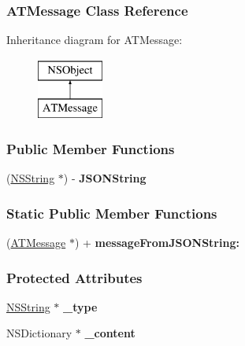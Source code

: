 \hypertarget{interface_a_t_message}{
\subsubsection{ATMessage Class Reference}
\label{interface_a_t_message}
}
Inheritance diagram for ATMessage:\begin{figure}[h]
\begin{center}
\leavevmode
\includegraphics[height=2.000000cm]{interface_a_t_message}
\end{center}
\end{figure}
\subsubsection*{Public Member Functions}
\begin{DoxyCompactItemize}
\item 
\hypertarget{interface_a_t_message_a479b92f064ea3982fe3fa1dc0046da64}{
(\hyperlink{class_n_s_string}{NSString} $\ast$) -\/ {\bfseries JSONString}}
\label{interface_a_t_message_a479b92f064ea3982fe3fa1dc0046da64}

\end{DoxyCompactItemize}
\subsubsection*{Static Public Member Functions}
\begin{DoxyCompactItemize}
\item 
\hypertarget{interface_a_t_message_a899be809d07eddd49c7a69edcdbbc643}{
(\hyperlink{interface_a_t_message}{ATMessage} $\ast$) + {\bfseries messageFromJSONString:}}
\label{interface_a_t_message_a899be809d07eddd49c7a69edcdbbc643}

\end{DoxyCompactItemize}
\subsubsection*{Protected Attributes}
\begin{DoxyCompactItemize}
\item 
\hypertarget{interface_a_t_message_a55260e89bdf6b62ed070c9c3109e1717}{
\hyperlink{class_n_s_string}{NSString} $\ast$ {\bfseries \_\-type}}
\label{interface_a_t_message_a55260e89bdf6b62ed070c9c3109e1717}

\item 
\hypertarget{interface_a_t_message_adfc3efefff0092008dfc5a77ab28f093}{
NSDictionary $\ast$ {\bfseries \_\-content}}
\label{interface_a_t_message_adfc3efefff0092008dfc5a77ab28f093}

\end{DoxyCompactItemize}
